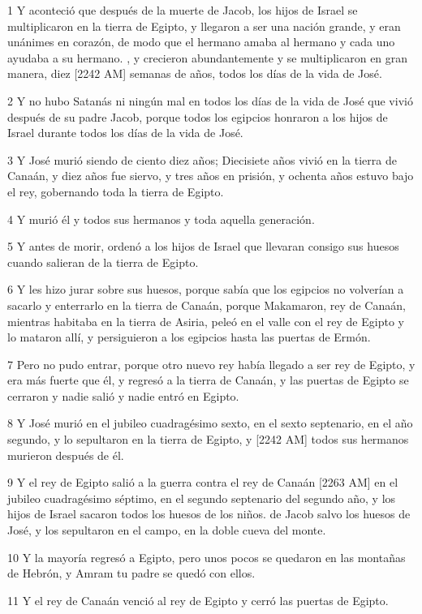 \par 1 Y aconteció que después de la muerte de Jacob, los hijos de Israel se multiplicaron en la tierra de Egipto, y llegaron a ser una nación grande, y eran unánimes en corazón, de modo que el hermano amaba al hermano y cada uno ayudaba a su hermano. , y crecieron abundantemente y se multiplicaron en gran manera, diez [2242 AM] semanas de años, todos los días de la vida de José.
\par 2 Y no hubo Satanás ni ningún mal en todos los días de la vida de José que vivió después de su padre Jacob, porque todos los egipcios honraron a los hijos de Israel durante todos los días de la vida de José.
\par 3 Y José murió siendo de ciento diez años; Diecisiete años vivió en la tierra de Canaán, y diez años fue siervo, y tres años en prisión, y ochenta años estuvo bajo el rey, gobernando toda la tierra de Egipto.
\par 4 Y murió él y todos sus hermanos y toda aquella generación.
\par 5 Y antes de morir, ordenó a los hijos de Israel que llevaran consigo sus huesos cuando salieran de la tierra de Egipto.
\par 6 Y les hizo jurar sobre sus huesos, porque sabía que los egipcios no volverían a sacarlo y enterrarlo en la tierra de Canaán, porque Makamaron, rey de Canaán, mientras habitaba en la tierra de Asiria, peleó en el valle con el rey de Egipto y lo mataron allí, y persiguieron a los egipcios hasta las puertas de Ermón.
\par 7 Pero no pudo entrar, porque otro nuevo rey había llegado a ser rey de Egipto, y era más fuerte que él, y regresó a la tierra de Canaán, y las puertas de Egipto se cerraron y nadie salió y nadie entró en Egipto.
\par 8 Y José murió en el jubileo cuadragésimo sexto, en el sexto septenario, en el año segundo, y lo sepultaron en la tierra de Egipto, y [2242 AM] todos sus hermanos murieron después de él.
\par 9 Y el rey de Egipto salió a la guerra contra el rey de Canaán [2263 AM] en el jubileo cuadragésimo séptimo, en el segundo septenario del segundo año, y los hijos de Israel sacaron todos los huesos de los niños. de Jacob salvo los huesos de José, y los sepultaron en el campo, en la doble cueva del monte.
\par 10 Y la mayoría regresó a Egipto, pero unos pocos se quedaron en las montañas de Hebrón, y Amram tu padre se quedó con ellos.
\par 11 Y el rey de Canaán venció al rey de Egipto y cerró las puertas de Egipto.
